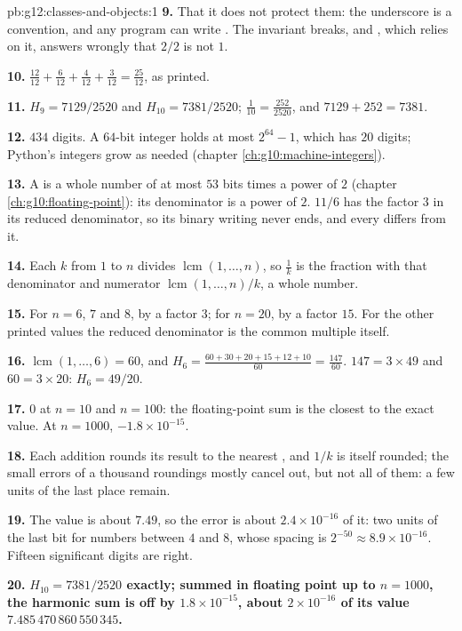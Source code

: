 \begin{solution}{pb:g12:classes-and-objects:1}
\textbf{9.} That it does not protect them: the underscore is a convention, and any program can write
. The invariant breaks, and , which relies on it, answers wrongly that $2/2$ is not
$1$.

\textbf{10.} $\frac{12}{12} + \frac{6}{12} + \frac{4}{12} + \frac{3}{12} = \frac{25}{12}$, as printed.

\textbf{11.} $H_9 = 7129/2520$ and $H_{10} = 7381/2520$; $\frac{1}{10} = \frac{252}{2520}$, and $7129 + 252 = 7381$.

\textbf{12.} $434$ digits. A $64$-bit integer holds at most $2^{64} - 1$, which has $20$ digits; Python's integers grow
as needed (chapter \ref{ch:g10:machine-integers}).

\textbf{13.} A  is a whole number of at most $53$ bits times a power of $2$
(chapter \ref{ch:g10:floating-point}): its denominator is a power of $2$. $11/6$ has the factor $3$ in its reduced
denominator, so its binary writing never ends, and every  differs from it.

\textbf{14.} Each $k$ from $1$ to $n$ divides $\operatorname{lcm}(1, \dots, n)$, so $\frac1k$ is the fraction with
that denominator and numerator $\operatorname{lcm}(1, \dots, n) / k$, a whole number.

\textbf{15.} For $n = 6$, $7$ and $8$, by a factor $3$; for $n = 20$, by a factor $15$. For the other printed values
the reduced denominator is the common multiple itself.

\textbf{16.} $\operatorname{lcm}(1, \dots, 6) = 60$, and $H_6 = \frac{60 + 30 + 20 + 15 + 12 + 10}{60} =
\frac{147}{60}$. $147 = 3 \times 49$ and $60 = 3 \times 20$: $H_6 = 49/20$.

\textbf{17.} $0$ at $n = 10$ and $n = 100$: the floating-point sum is the closest  to the exact
value. At $n = 1000$, $-1.8 \times 10^{-15}$.

\textbf{18.} Each addition rounds its result to the nearest , and $1/k$ is itself rounded; the
small errors of a thousand roundings mostly cancel out, but not all of them: a few units of the last place remain.

\textbf{19.} The value is about $7.49$, so the error is about $2.4 \times 10^{-16}$ of it: two units of the last bit
for numbers between $4$ and $8$, whose spacing is $2^{-50} \approx 8.9 \times 10^{-16}$. Fifteen significant digits
are right.

\textbf{20.} \textbf{$H_{10} = 7381/2520$ exactly; summed in floating point up to $n = 1000$, the harmonic sum is off
by $1.8 \times 10^{-15}$, about $2 \times 10^{-16}$ of its value $7.485\,470\,860\,550\,345$.}
\end{solution}

